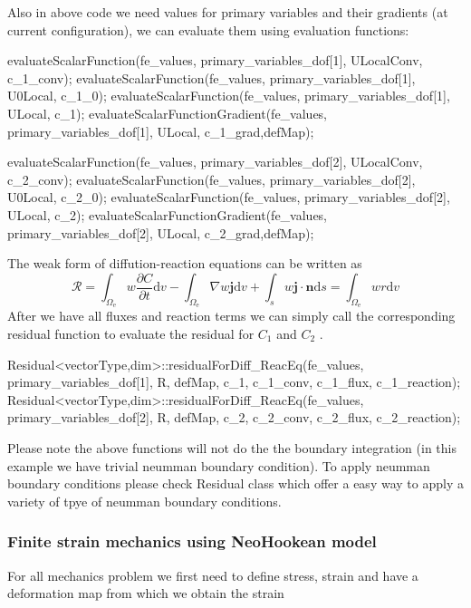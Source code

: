  Also in above code we need values for primary variables and their gradients (at current configuration), we can evaluate them using {\ttfamily evaluation} {\ttfamily functions\-:} 
\begin{DoxyCode}
evaluateScalarFunction(fe\_values, primary\_variables\_dof[1], ULocalConv, c\_1\_conv);
evaluateScalarFunction(fe\_values, primary\_variables\_dof[1], U0Local, c\_1\_0);
evaluateScalarFunction(fe\_values, primary\_variables\_dof[1], ULocal, c\_1);   
evaluateScalarFunctionGradient(fe\_values, primary\_variables\_dof[1], ULocal, c\_1\_grad,defMap);

evaluateScalarFunction(fe\_values, primary\_variables\_dof[2], ULocalConv, c\_2\_conv);
evaluateScalarFunction(fe\_values, primary\_variables\_dof[2], U0Local, c\_2\_0);
evaluateScalarFunction(fe\_values, primary\_variables\_dof[2], ULocal, c\_2);   
evaluateScalarFunctionGradient(fe\_values, primary\_variables\_dof[2], ULocal, c\_2\_grad,defMap);
\end{DoxyCode}
 The weak form of diffution-\/reaction equations can be written as \[ \mathscr{R}=\int_{\Omega_{\text{e}}}w\frac{\partial C}{\partial t}\text{d}v-\int_{\Omega_{\text{e}}} \nabla w \boldsymbol{j} \text{d}v+\int_{s}w\boldsymbol{j}\cdot\boldsymbol{n} \text{d}s=\int_{\Omega_{\text{e}}}w r \text{d}v \] After we have all fluxes and reaction terms we can simply call the corresponding residual function to evaluate the residual for $C_\text{1}$ and $C_\text{2}$ . 
\begin{DoxyCode}
Residual<vectorType,dim>::residualForDiff_ReacEq(fe\_values, primary\_variables\_dof[1], R, defMap, c\_1, 
      c\_1\_conv, c\_1\_flux, c\_1\_reaction);
Residual<vectorType,dim>::residualForDiff_ReacEq(fe\_values, primary\_variables\_dof[2], R, defMap, c\_2, 
      c\_2\_conv, c\_2\_flux, c\_2\_reaction);
\end{DoxyCode}
 Please note the above functions will not do the the boundary integration (in this example we have trivial neumman boundary condition). To apply neumman boundary conditions please check {\ttfamily Residual} class which offer a easy way to apply a variety of tpye of neumman boundary conditions. \hypertarget{brain_morph_mechanics}{}\subsubsection{Finite strain mechanics using Neo\-Hookean model}\label{brain_morph_mechanics}
For all mechanics problem we first need to define stress, strain and have a deformation map from which we obtain the strain 
